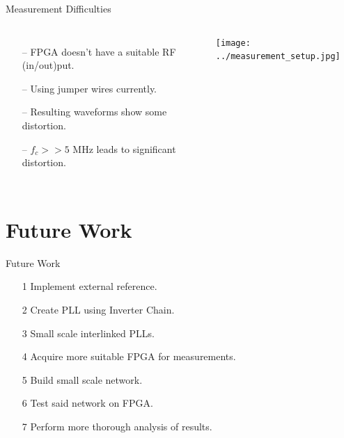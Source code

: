 \documentclass{beamer}
\begin{document}
\begin{frame}{Measurement Difficulties}
\vspace*{-5mm}
\begin{columns}
	\begin{itemize}
		\item[--]
			FPGA doesn't have a suitable RF (in/out)put.
		\item[--]
			Using jumper wires currently.
		\item[--]
			Resulting waveforms show some distortion.
		\item[--]
			$f_c>>5\textrm{ MHz}$ leads to significant distortion.
	\end{itemize}
    \texttt{[image: ../measurement\_setup.jpg]}

\end{columns}
\end{frame}

\section*{Future Work}

\begin{frame}{Future Work}
    \begin{itemize}
        \item[1]
            Implement external reference. %
        \item[2]
            Create PLL using Inverter Chain. %
        \item[3]
            Small scale interlinked PLLs. %
        \item[4]
            Acquire more suitable FPGA for measurements. %
        \item[5]
            Build small scale network. %
        \item[6]
            Test said network on FPGA. %
        \item[7]
            Perform more thorough analysis of results. %
    \end{itemize}
 
\end{frame}
\end{document}
